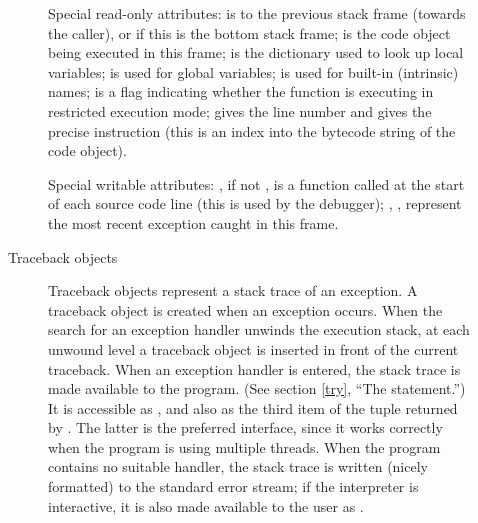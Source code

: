 \begin{description}
\begin{description}
Special read-only attributes:  is to the previous
stack frame (towards the caller), or  if this is the bottom
stack frame;  is the code object being executed in this
frame;  is the dictionary used to look up local
variables;  is used for global variables;
 is used for built-in (intrinsic) names;
 is a flag indicating whether the function is
executing in restricted execution mode;
 gives the line number and  gives the
precise instruction (this is an index into the bytecode string of
the code object).

Special writable attributes: , if not , is a
function called at the start of each source code line (this is used by
the debugger); , ,
 represent the most recent exception caught in
this frame.

\item[Traceback objects] \label{traceback}
Traceback objects represent a stack trace of an exception.  A
traceback object is created when an exception occurs.  When the search
for an exception handler unwinds the execution stack, at each unwound
level a traceback object is inserted in front of the current
traceback.  When an exception handler is entered, the stack trace is
made available to the program.
(See section \ref{try}, ``The  statement.'')
It is accessible as , and also as the third
item of the tuple returned by .  The latter is
the preferred interface, since it works correctly when the program is
using multiple threads.
When the program contains no suitable handler, the stack trace is written
(nicely formatted) to the standard error stream; if the interpreter is
interactive, it is also made available to the user as
.


\end{description}
\end{description}
